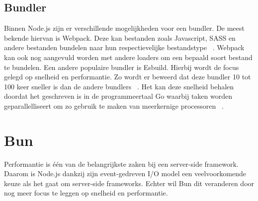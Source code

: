 \subsection{Bundler}
Binnen Node.js zijn er verschillende mogelijkheden voor een bundler. De meest bekende hiervan is Webpack. 
Deze kan bestanden zoals Javascript, SASS en andere bestanden bundelen naar hun respectievelijke bestandstype ~\autocite{Laurila2020}. 
Webpack kan ook nog aangevuld worden met andere loaders om een bepaald soort bestand te bundelen. Een andere populaire bundler is Esbuild.
Hierbij wordt de focus gelegd op snelheid en performantie. Zo wordt er beweerd dat deze bundler 10 tot 100 keer sneller is dan de andere bundlers ~\autocite{Couriol2020}.
Het kan deze snelheid behalen doordat het geschreven is in de programmeertaal Go waarbij taken worden geparallelliseert om zo gebruik te maken van meerkernige processoren ~\autocite{Couriol2020}.

\section{Bun}
Performantie is één van de belangrijkste zaken bij een server-side framework. 
Daarom is Node.js dankzij zijn event-gedreven I/O model een veelvoorkomende keuze als het gaat om server-side frameworks.
Echter wil Bun dit veranderen door nog meer focus te leggen op snelheid en performantie.

